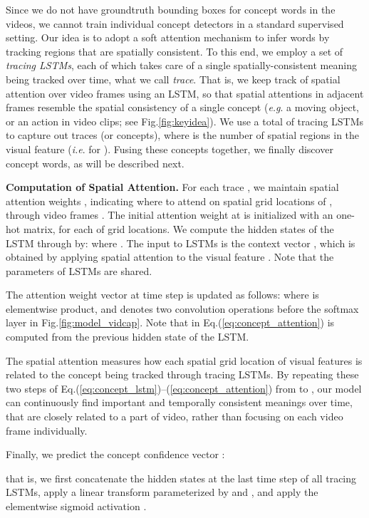 \documentclass[10pt,twocolumn,letterpaper]{article}
\makeatletter
\theoremstyle{nonumberplain}
\DeclareRobustCommand\onedot{\futurelet\@let@token\@onedot}
\def\onedot{.\@\xspace}
\def\eg{\emph{e.g}\onedot} \def\Eg{\emph{E.g}\onedot}
\def\ie{\emph{i.e}\onedot} \def\Ie{\emph{I.e}\onedot}
\makeatother
\begin{document}
Since we do not have groundtruth bounding boxes for concept words in the videos, we cannot train individual concept detectors in a standard supervised setting.
Our idea is to adopt a soft attention mechanism to infer words by tracking regions that are spatially consistent.  To this end,
we employ a set of \emph{tracing LSTMs}, each of which takes care of a single spatially-consistent meaning
being tracked over time, what we call \emph{trace}.
That is, we keep track of spatial attention over video frames using an LSTM,
so that spatial attentions in adjacent frames resemble the spatial consistency
of a single concept (\eg a moving object, or an action in video clips; see Fig.\ref{fig:keyidea}).
We use a total of  tracing LSTMs to capture out  traces (or concepts),
where  is the number of spatial regions in the visual feature (\ie  for ).
Fusing these  concepts together, we finally discover  concept words,
as will be described next.

\textbf{Computation of Spatial Attention.}
\newcommand{\bfalpha}{\boldsymbol{\alpha}}
For each trace , we maintain spatial attention weights ,
indicating where to attend on  spatial grid locations of ,
through video frames .
The initial attention weight  at  is initialized with an one-hot matrix,
for each of  grid locations.
We compute the hidden states  of the LSTM
through  by:
where .
The input to LSTMs is the context vector ,
which is obtained by applying spatial attention  to the visual feature .
Note that the parameters of  LSTMs are shared.

The attention weight vector 
at time step  is updated as follows:
where  is elementwise product, and  denotes two convolution operations before the softmax layer in Fig.\ref{fig:model_vidcap}.
Note that  in Eq.(\ref{eq:concept_attention}) is computed from the previous hidden state  of the LSTM.

The spatial attention  measures
how each spatial grid location of visual features is related to the concept being tracked through tracing LSTMs.
By repeating these two steps of Eq.(\ref{eq:concept_lstm})--(\ref{eq:concept_attention}) from  to ,
our model can continuously find important and temporally consistent meanings over time,
that are closely related to a part of video,
rather than focusing on each video frame individually.

Finally, we predict the concept confidence vector :

that is, we first concatenate the hidden states  at the last time step of all tracing LSTMs,
apply a linear transform parameterized by  and ,
and apply the elementwise sigmoid activation .
\end{document}
